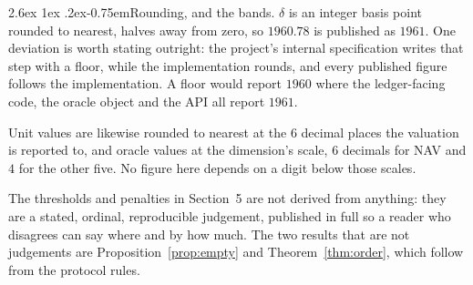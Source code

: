 \documentclass[11pt]{article}
\makeatletter
\renewcommand\paragraph{\@startsection{paragraph}{4}{\z@}%
  {2.6ex \@plus 1ex \@minus .2ex}{-0.75em}{\normalfont\normalsize\bfseries}}
\theoremstyle{orma}
\theoremstyle{ormaupright}
\makeatother
\begin{document}
\paragraph{Rounding, and the bands.} $\delta$ is an integer basis point rounded to nearest,
halves away from zero, so $1960.78$ is published as $1961$. One deviation is worth stating
outright: the project's internal specification writes that step with a floor, while the
implementation rounds, and every published figure follows the implementation. A floor would
report $1960$ where the ledger-facing code, the oracle object and the API all report $1961$.

Unit values are likewise rounded to nearest at the $6$ decimal places the valuation is
reported to, and oracle values at the dimension's scale, $6$ decimals for NAV and $4$ for the
other five. No figure here depends on a digit below those scales.

The thresholds and
penalties in Section~5 are not derived from anything: they are a stated, ordinal,
reproducible judgement, published in full so a reader who disagrees can say where and by how
much. The two results that are not judgements are Proposition~\ref{prop:empty} and
Theorem~\ref{thm:order}, which follow from the protocol rules.
\end{document}
